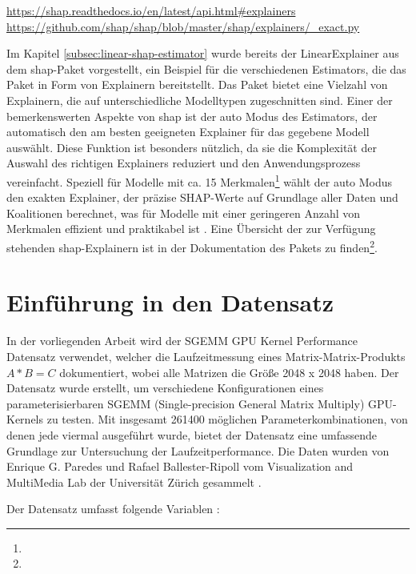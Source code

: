 \urldef{\shapurl}\url{https://shap.readthedocs.io/en/latest/api.html#explainers}
\urldef{\exacturl}\url{https://github.com/shap/shap/blob/master/shap/explainers/_exact.py}

Im Kapitel \ref{subsec:linear-shap-estimator} wurde bereits der LinearExplainer aus dem \textsf{shap}-Paket 
vorgestellt, ein Beispiel für die verschiedenen Estimators, die das Paket in Form von Explainern bereitstellt. 
Das Paket bietet eine Vielzahl von Explainern, die auf unterschiedliche Modelltypen zugeschnitten sind. 
Einer der bemerkenswerten Aspekte von \textsf{shap} ist der auto Modus des Estimators, 
der automatisch den am besten geeigneten Explainer für das gegebene Modell auswählt. 
Diese Funktion ist besonders nützlich, da sie die Komplexität der Auswahl des richtigen Explainers 
reduziert und den Anwendungsprozess vereinfacht. Speziell für Modelle mit ca. 15 Merkmalen\footnote{\exacturl} wählt der 
auto Modus den exakten Explainer, der präzise SHAP-Werte auf Grundlage aller Daten und Koalitionen berechnet, was für Modelle mit einer geringeren Anzahl 
von Merkmalen effizient und praktikabel ist \cite[S. 40f]{Molnar_2023}. Eine Übersicht der zur Verfügung stehenden \textsf{shap}-Explainern ist in der
Dokumentation des Pakets zu finden\footnote{\shapurl}. 


\section{Einführung in den Datensatz}

In der vorliegenden Arbeit wird der SGEMM GPU Kernel Performance Datensatz verwendet, welcher die Laufzeitmessung eines Matrix-Matrix-Produkts 
\(A*B = C\) dokumentiert, wobei alle Matrizen die Größe 2048 x 2048 haben. 
Der Datensatz wurde erstellt, um verschiedene Konfigurationen eines parameterisierbaren SGEMM 
(Single-precision General Matrix Multiply) GPU-Kernels zu testen. Mit insgesamt 261400 möglichen Parameterkombinationen, 
von denen jede viermal ausgeführt wurde, bietet der Datensatz eine umfassende Grundlage zur Untersuchung der Laufzeitperformance.
Die Daten wurden von Enrique G. Paredes und Rafael Ballester-Ripoll vom Visualization and MultiMedia Lab der Universität 
Zürich gesammelt \cite{ballesterripoll2017sobol, Nugteren_2015}. 

Der Datensatz umfasst folgende Variablen \cite{misc_sgemm_gpu_kernel_performance_440}:

